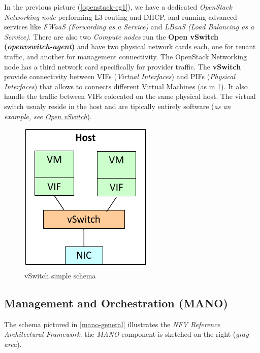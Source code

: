 \documentclass[10pt,a4paper]{report}
\theoremstyle{definition}
\begin{document}
In the previous picture (\ref{openstack-eg1}), we have a dedicated \textit{OpenStack Networking node} performing L3 routing and DHCP, and running advanced services like
\textit{FWaaS (Forwarding as a Service)} and \textit{LBaaS (Load Balancing as a Service)}.
There are also two \textit{Compute nodes} run the \textbf{Open vSwitch (\textit{openvswitch-agent})} and have two physical network cards each, one for tenant traffic, and another for management connectivity.
The OpenStack Networking node has a third network card specifically for provider traffic.
The \textbf{vSwitch} provide connectivity between VIFs (\textit{Virtual Interfaces}) and PIFs (\textit{Physical Interfaces}) that allows to connects different Virtual Machines (as in \ref{vswitch-schema}). It also handle the traffic between VIFs colocated on the same physical host. The virtual switch usualy reside in the host and are tipically entirely software (\textit{as an example, see \href{https://openvswitch.org}{Open vSwitch}}).
\begin{figure}[h]
	\centering\includegraphics[scale=0.50]{images/Pasted image 20230405172826.png}
	\caption{vSwitch simple schema}
\label{vswitch-schema}
\end{figure}

\subsection{Management and Orchestration (MANO)}\label{sec:management-and-orchestration-mano}
The schema pictured in \ref{mano-general} illustrates the \textit{NFV Reference Architectural Framework}: the \textit{MANO} component is sketched on the right (\textit{gray area}).
\end{document}
